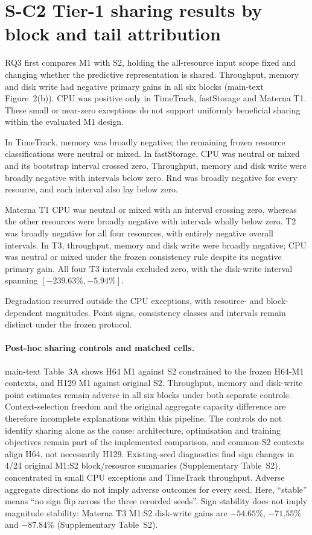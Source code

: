 \documentclass[a4paper,11pt]{article}
\begin{document}
\clearpage
\section*{S-C2 Tier-1 sharing results by block and tail attribution}
RQ3 first compares M1 with S2, holding the all-resource input scope fixed and changing
whether the predictive representation is shared. Throughput, memory and disk
write had negative primary gains in all six blocks
(main-text Figure~2(b)). CPU was positive only in TimeTrack,
fastStorage and Materna T1. These small or near-zero exceptions do not support
uniformly beneficial sharing within the evaluated M1 design.

In TimeTrack, memory was broadly negative; the remaining frozen resource
classifications were neutral or mixed. In fastStorage, CPU was neutral or
mixed and its bootstrap interval crossed zero. Throughput, memory and disk
write were broadly negative with intervals below zero. Rnd was broadly
negative for every resource, and each interval also lay below zero.

Materna T1 CPU was neutral or mixed with an interval crossing zero, whereas
the other resources were broadly negative with intervals wholly below zero.
T2 was broadly negative for all four resources, with entirely negative
overall intervals. In T3, throughput, memory and disk write were broadly
negative; CPU was neutral or mixed under the frozen consistency rule despite
its negative primary gain. All four T3 intervals excluded zero, with the
disk-write interval spanning $[-239.63\%,-5.94\%]$.

Degradation recurred outside the CPU exceptions, with resource- and
block-dependent magnitudes. Point signs, consistency classes and intervals
remain distinct under the frozen protocol.

\paragraph{Post-hoc sharing controls and matched cells.}
main-text Table~3A shows H64 M1 against S2 constrained to the
frozen H64-M1 contexts, and H129 M1 against original S2. Throughput, memory
and disk-write point estimates remain adverse in all six blocks under both
separate controls. Context-selection freedom and the original aggregate
capacity difference are therefore incomplete explanations within this
pipeline. The controls do not identify sharing alone as the cause:
architecture, optimisation and training objectives remain part of the
implemented comparison, and common-S2 contexts align H64, not necessarily
H129. Existing-seed diagnostics find sign changes in 4/24 original M1:S2
block/resource summaries (Supplementary Table~S2), concentrated in small
CPU exceptions and TimeTrack throughput. Adverse aggregate directions do not
imply adverse outcomes for every seed. Here, ``stable'' means ``no sign flip
across the three recorded seeds''. Sign stability does not imply magnitude
stability: Materna T3 M1:S2 disk-write gains are $-54.65\%$, $-71.55\%$ and
$-87.84\%$ (Supplementary Table~S2).
\end{document}

